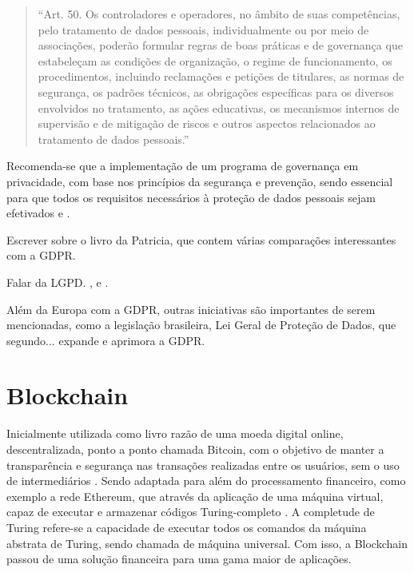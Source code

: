 \begin{quote}
``Art. 50. Os controladores e operadores, no âmbito de suas competências, pelo tratamento de dados pessoais, individualmente ou por meio de associações, poderão formular regras de boas práticas e de governança que estabeleçam as condições de organização, o regime de funcionamento, os procedimentos, incluindo reclamações e petições de titulares, as normas de segurança, os padrões técnicos, as obrigações específicas para os diversos envolvidos no tratamento, as ações educativas, os mecanismos internos de supervisão e de mitigação de riscos e outros aspectos relacionados ao tratamento de dados pessoais.''
\end{quote}

Recomenda-se que a implementação de um programa de governança em privacidade, com base nos princípios da segurança e prevenção, sendo essencial para que todos os requisitos necessários à proteção de dados pessoais sejam efetivados \citep{monteiro_efetividade_2019} e \cite{pinheiro_protecao_2020}.


Escrever sobre o livro da Patricia, que contem várias comparações interessantes com a GDPR. \cite{pinheiro_protecao_2020}

Falar da LGPD. \citep{carvalho_desafios_2019}, \citep{monteiro_efetividade_2019} e \citep{dadamos_fatores_2022}.

Além da Europa com a GDPR, outras iniciativas são importantes de serem mencionadas, como a legislação brasileira, Lei Geral de Proteção de Dados, que segundo... expande e aprimora a GDPR.

\chapter{Blockchain}

Inicialmente utilizada como livro razão de uma moeda digital online, descentralizada, ponto a ponto chamada Bitcoin, com o objetivo de manter a transparência e segurança nas transações realizadas entre os usuários, sem o uso de intermediários \cite{Nakamoto2009}. Sendo adaptada para além do processamento financeiro, como exemplo a rede Ethereum, que através da aplicação de uma máquina virtual, capaz de executar e armazenar códigos Turing-completo \cite{buterin_ethereum_2014}. A completude de Turing refere-se a capacidade de executar todos os comandos da máquina abstrata de Turing, sendo chamada de máquina universal. Com isso, a Blockchain passou de uma solução financeira para uma gama maior de aplicações.

